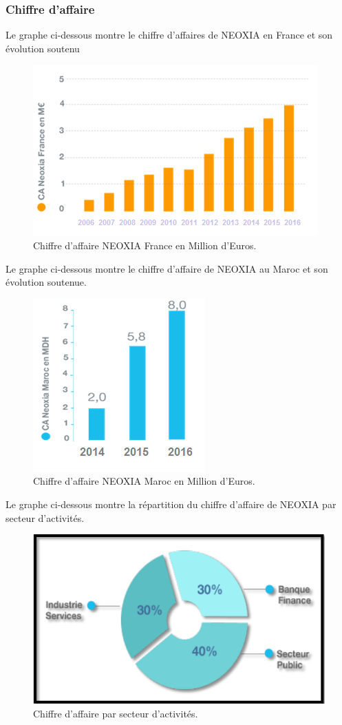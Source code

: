 \documentclass[a4paper, 12pt]{report}
\begin{document}
\subsubsection{Chiffre d'affaire}
Le graphe ci-dessous montre le chiffre d’affaires de NEOXIA en France et son évolution
soutenu

\begin{figure}[H]
\centering
\includegraphics[scale=0.9]{ca.png}
\caption{Chiffre d'affaire NEOXIA France en Million d'Euros.}
\end{figure}
Le graphe ci-dessous montre le chiffre d'affaire de NEOXIA au Maroc et son évolution soutenue.
\begin{figure}[H]
\centering
\includegraphics[scale=0.9]{nxmaroc.png}
\caption{Chiffre d'affaire NEOXIA Maroc en Million d'Euros.}
\end{figure}
Le graphe ci-dessous montre la répartition du chiffre d'affaire de NEOXIA par secteur
d'activités.
\begin{figure}[H]
\centering
\includegraphics[scale=0.9]{secteur.png}
\caption{Chiffre d'affaire par secteur d'activités.}
\end{figure}
\end{document}
